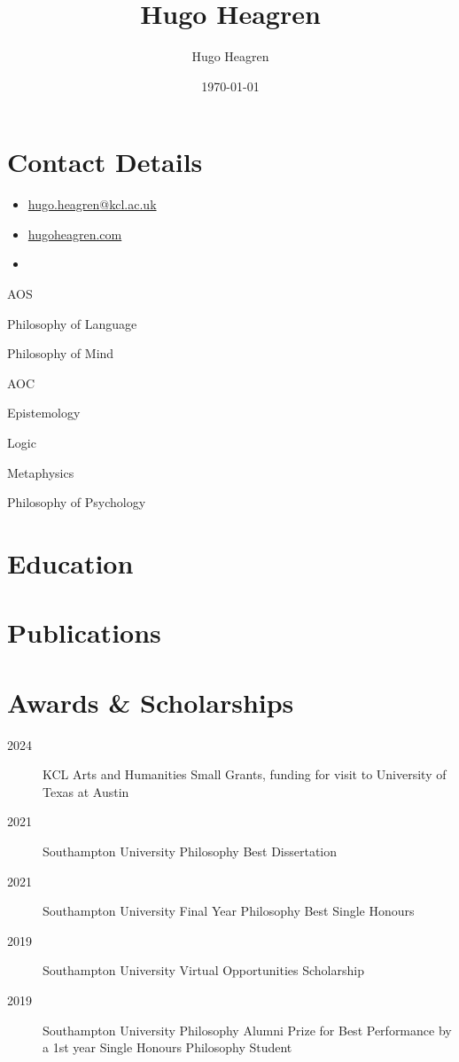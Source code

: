 \documentclass{cv}
\author{Hugo Heagren}
\date{\today}
\title{Hugo Heagren}
\begin{document}
\maketitle
\nocite{*}

\section*{Contact Details}
\begin{itemize}
\item \href{mailto:hugo.heagren@kcl.ac.uk}{hugo.heagren@kcl.ac.uk}
\item \href{https://hugoheagren.com}{hugoheagren.com}
\item {}
\end{itemize}

\begin{areas}
\item[{AOS}]%
  \begin{area}
  \item Philosophy of Language
  \item Philosophy of Mind
  \end{area}
\item[{AOC}]%
  \begin{area}
  \item Epistemology
  \item Logic
  \item Metaphysics
  \item Philosophy of Psychology
\end{area}
\end{areas}

\section*{Education}
\printbibliography[check=Education]{}

\section*{Publications}
\printbibliography[check=Article]{}

\section*{Awards \& Scholarships}
\begin{description}
\item[{2024}] KCL Arts and Humanities Small Grants, funding for visit to
  University of Texas at Austin
\item[{2021}] Southampton University Philosophy Best Dissertation
\item[{2021}] Southampton University Final Year Philosophy Best Single
  Honours
\item[{2019}] Southampton University Virtual Opportunities Scholarship
\item[{2019}] Southampton University Philosophy Alumni Prize for Best
  Performance by a 1st year Single Honours Philosophy Student
\end{description}
\end{document}
